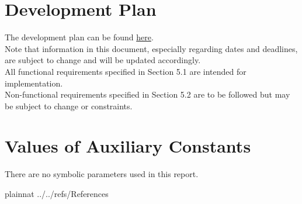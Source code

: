 \documentclass[12pt]{article}
\begin{document}



\newpage

\section{Development Plan}

The development plan can be found \href{https://github.com/PlutosCapstone/Plutos/blob/main/docs/DevelopmentPlan/DevelopmentPlan.pdf}{here}. \\

\noindent Note that information in this document, especially regarding dates and deadlines, are subject to change and will be updated accordingly. \\

\noindent All functional requirements specified in Section 5.1 are intended for implementation. \\

\noindent Non-functional requirements specified in Section 5.2 are to be followed but may be subject to change or constraints. \\

\section{Values of Auxiliary Constants}

There are no symbolic parameters used in this report.

\newpage

 {plainnat}
 {../../refs/References}

\newpage


\newpage{}
\end{document}
